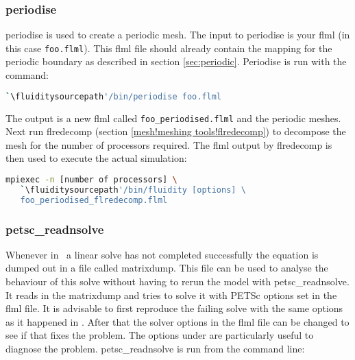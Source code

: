 
\subsubsection{periodise}
\label{sec:periodise}
periodise is used to create a periodic mesh. The input to periodise is your flml (in this case
\lstinline{foo.flml}). This flml file should already contain the mapping for
the periodic boundary as described in section
\ref{sec:periodic}. Periodise is run with the command:

\begin{lstlisting}[language=bash]
`\fluiditysourcepath'/bin/periodise foo.flml
\end{lstlisting}

The output is a new flml called \lstinline+foo_periodised.flml+ and the
periodic meshes. Next run flredecomp (section \ref{mesh!meshing
  tools!flredecomp}) to decompose the mesh for the number of processors
required. The flml output by flredecomp is then used to execute the actual simulation:

\begin{lstlisting}[language=bash]
mpiexec -n [number of processors] \
   `\fluiditysourcepath'/bin/fluidity [options] \
   foo_periodised_flredecomp.flml
\end{lstlisting}



\subsubsection{petsc\_readnsolve}
\label{sec:petsc_readnsolve}
Whenever in \fluidity\ a linear solve has not completed successfully the equation is dumped out in a file called matrixdump. This file can be used to analyse the behaviour of this solve without having to rerun the model with petsc\_readnsolve. It reads in the matrixdump and tries to solve it with PETSc options set in the flml file. It is advisable to first reproduce the failing solve with the same options as it happened in \fluidity. After that the solver options in the flml file can be changed to see if that fixes the problem. The options under  are particularly useful to diagnose the problem.  petsc\_readnsolve is run from the command line:

